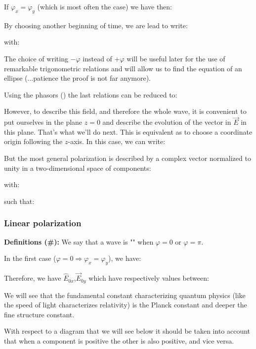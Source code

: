 	If $\varphi_x=\varphi_y$ (which is most often the case) we have then:
	
	By choosing another beginning of time, we are lead to write:
	
	with:
	
	\begin{tcolorbox}[title=Remark,colframe=black,arc=10pt]
	The choice of writing $-\varphi$ instead of $+\varphi$ will be useful later for the use of remarkable trigonometric relations and will allow us to find the equation of an ellipse (...patience the proof is not far anymore).
	\end{tcolorbox}
	Using the phasors () the last relations can be reduced to:
	
	However, to describe this field, and therefore the whole wave, it is convenient to put ourselves in the plane $z=0$ and describe the evolution of the vector in $\vec{E}$ in this plane. That's what we'll do next. This is equivalent as to choose a coordinate origin following the $z$-axis. In this case, we can write:
	
	But the most general polarization is described by a complex vector normalized to unity in a two-dimensional space of components:
	
	with:
	
	such that:
	
	
	
	\subsubsection{Linear polarization}
	\textbf{Definitions (\#\mydef):} We say that a wave is "" when $\varphi=0$ or $\varphi=\pi$.

	In the first case ($\varphi=0\Rightarrow \varphi_x=\varphi_y$), we have:
	
	
	Therefore, we have $\hat{E}_{0x}$,$\vec{E}_{0y}$ which have respectively values between:
	
	\begin{tcolorbox}[title=Remark,colframe=black,arc=10pt]
	We will see that the fundamental constant characterizing quantum physics (like the speed of light characterizes relativity) is the Planck constant and deeper the fine structure constant.
	\end{tcolorbox}	
	With respect to a diagram that we will see below it should be taken into account that when a component is positive the other is also positive, and vice versa.

